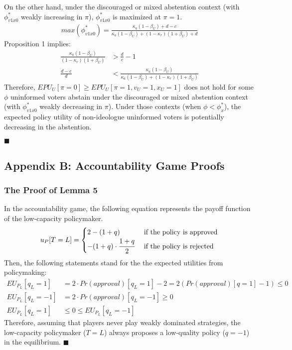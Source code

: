 \par On the other hand, under the discouraged or mixed abstention context (with $\phi^*_{v1x0}$ weakly increasing in $\pi$), $\phi^*_{v1x0}$ is maximized at $\pi=1$.
\begin{align*}
max(\phi^*_{v1x0}) = \frac{\kappa_a(1-\beta_U)+d-c}{\kappa_a(1-\beta_U)+(1-\kappa_r)(1+\beta_U)+d}
\end{align*}
\noindent Proposition 1 implies:
\begin{align*}
\frac{\kappa_a(1-\beta_U)}{(1-\kappa_r)(1+\beta_U)} &> \frac{d}{c} - 1 \\
\frac{d-c}{d} &< \frac{\kappa_a(1-\beta_U)}{\kappa_a(1-\beta_U)+(1-\kappa_r)(1+\beta_U)}
\end{align*}
\noindent Therefore, $EPU_U[\pi=0] \geq EPU_U[\pi=1,v_U=1,x_U=1]$ does not hold for some $\phi$ uninformed voters abstain under the discouraged or mixed abstention context (with $\phi^*_{v1x0}$ weakly decreasing in $\pi$). Under those contexts (when $\phi < \phi^*_x$), the expected policy utility of non-ideologue uninformed voters is potentially decreasing in the abstention.

\hfill $\blacksquare$

\clearpage
\subsection{Appendix B: Accountability Game Proofs}

\subsubsection{The Proof of Lemma 5}

\par In the accountability game, the following equation represents the payoff function of the low-capacity policymaker.
\begin{align*}
u_P[T=L] = \begin{cases}
2 - (1+q) &\text{ if the policy is approved} \\
- (1+q) \cdot \cfrac{1+q}{2} &\text{ if the policy is rejected} \\
\end{cases}
\end{align*}
Then, the following statements stand for the the expected utilities from policymaking:
\begin{align*}
EU_{P_L}[q_L=1] &= 2 \cdot Pr(approval)[q_L=1]  - 2 = 2 (Pr(approval)[q=1]-1) \leq 0\\
EU_{P_L}[q_L=-1] &= 2 \cdot Pr(approval)[q_L=-1] \geq 0 \\
EU_{P_L}[q_L=1] &\leq 0 \leq EU_{P_L}[q_L=-1]
\end{align*}
\noindent Therefore, assuming that players never play weakly dominated strategies, the low-capacity policymaker ($T=L$) always proposes a low-quality policy ($q=-1$) in the equilibrium. 
\hfill $\blacksquare$


